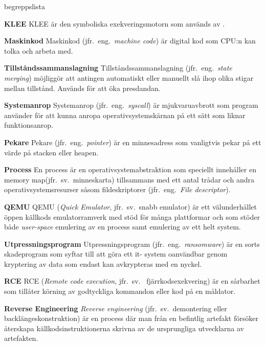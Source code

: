 \begin{labeling}{begreppslista}
    \item [\textbf{KLEE}] KLEE är den symboliska exekveringsmotorn som används
    av \stoe{}.

    \item [\textbf{Maskinkod}] Maskinkod (jfr.\ eng.\ \emph{machine code}) är
    digital kod som CPU:n kan tolka och arbeta med.

    \item [\textbf{Tillståndssammanslagning}] Tillståndssammanslagning (jfr.\
    eng.\ \emph{state merging}) möjliggör att antingen automatiskt eller
    manuellt slå ihop olika stigar mellan tillstånd. Används för att öka
    presdandan.

    \item [\textbf{Systemanrop}] Systemanrop (jfr.\ eng.\ \emph{syscall}) är
    mjukvaruavbrott som program använder för att kunna anropa
    operativsystemskärnan på ett sätt som liknar funktionsanrop.

    \item [\textbf{Pekare}] Pekare (jfr.\ eng.\ \emph{pointer}) är en minnesadress som
    vanligtvis pekar på ett värde på stacken eller heapen.

    \item [\textbf{Process}] En process är en
    operativsystemabstraktion som speciellt innehåller en memory
    map(jfr.\ sv.\ minneskarta) tillsammans med ett antal trådar och
    andra operativsystemsresurser såsom fildeskriptorer (jfr.\
    eng.\ \emph{File descriptor}).

    \item [\textbf{QEMU}] QEMU (\emph{Quick Emulator}, jfr.\ sv.\ snabb
    emulator) är ett välunderhållet öppen källkods emulatorramverk
    med stöd för många plattformar och som stöder både \emph{user-space}
    emulering av en process samt emulering av ett helt system.

    \item [\textbf{Utpressningsprogram}] Utpressningsprogram (jfr.\ eng.\
    \emph{ransomware}) är en sorts skadeprogram som syftar till att göra ett it-
    system oanvändbar genom kryptering av data som endast kan avkrypteras med
    en nyckel.

    \item [\textbf{RCE}] RCE (\emph{Remote code execution}, jfr.\ sv.
    \ fjärrkodsexekvering) är en sårbarhet som tillåter körning av
    godtyckliga kommandon eller kod på en måldator.

    \item [\textbf{Reverse Engineering}] \emph{Reverse engineering} (jfr.\ sv.\
    demontering eller backlängeskonstruktion) är en process där man från en
    befintlig artefakt försöker återskapa källkodsinstruktionerna
    skrivna av de ursprungliga utvecklarna av artefakten.


\end{labeling}
